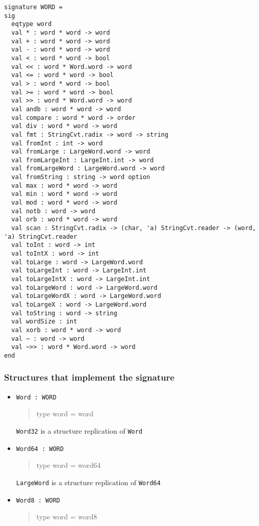 \documentclass{jbook}
\newcommand{\txt}[2]{#2}
\newcommand{\code}[1]{\mbox{\large\tt #1}}
\newenvironment{program}{\begin{quote}\begin{tt}}%
                        {\end{tt}\end{quote}}
\newcommand{\Structure}{\subsubsection*{\txt{シグネチャを実装するストラクチャ}{Structures that implement the signature}}}
\begin{document}
\begin{verbatim}
signature WORD =
sig
  eqtype word
  val * : word * word -> word
  val + : word * word -> word
  val - : word * word -> word
  val < : word * word -> bool
  val << : word * Word.word -> word
  val <= : word * word -> bool
  val > : word * word -> bool
  val >= : word * word -> bool
  val >> : word * Word.word -> word
  val andb : word * word -> word
  val compare : word * word -> order
  val div : word * word -> word
  val fmt : StringCvt.radix -> word -> string
  val fromInt : int -> word
  val fromLarge : LargeWord.word -> word
  val fromLargeInt : LargeInt.int -> word
  val fromLargeWord : LargeWord.word -> word
  val fromString : string -> word option
  val max : word * word -> word
  val min : word * word -> word
  val mod : word * word -> word
  val notb : word -> word
  val orb : word * word -> word
  val scan : StringCvt.radix -> (char, 'a) StringCvt.reader -> (word, 'a) StringCvt.reader
  val toInt : word -> int
  val toIntX : word -> int
  val toLarge : word -> LargeWord.word
  val toLargeInt : word -> LargeInt.int
  val toLargeIntX : word -> LargeInt.int
  val toLargeWord : word -> LargeWord.word
  val toLargeWordX : word -> LargeWord.word
  val toLargeX : word -> LargeWord.word
  val toString : word -> string
  val wordSize : int
  val xorb : word * word -> word
  val ~ : word -> word
  val ~>> : word * Word.word -> word
end
\end{verbatim}

\Structure
\begin{itemize}
\item \code{Word : WORD}
\begin{program}
  type word = word
\end{program}
\txt{\code{Word32}は\code{Word}のストラクチャリプリケーション}
{\code{Word32} is a structure replication of \code{Word}}

\item \code{Word64 : WORD}
\begin{program}
  type word = word64
\end{program}
\txt{\code{LargeWord}は\code{Word64}のストラクチャリプリケーション}
{\code{LargeWord} is a structure replication of \code{Word64}}

\item \code{Word8 : WORD}
\begin{program}
  type word = word8
\end{program}
\end{itemize}
\end{document}

